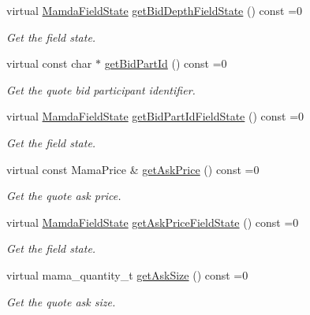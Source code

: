 \begin{CompactItemize}
virtual \hyperlink{namespaceWombat_93aac974f2ab713554fd12a1fa3b7d2a}{Mamda\-Field\-State} \hyperlink{classWombat_1_1MamdaQuotePossiblyDuplicate_4b1d107fcfe64b924befd77fe85bd953}{get\-Bid\-Depth\-Field\-State} () const =0
\begin{CompactList}\small\item\em Get the field state. \item\end{CompactList}\item 
virtual const char $\ast$ \hyperlink{classWombat_1_1MamdaQuotePossiblyDuplicate_fed97084e8d88c1c9aefb5dfb85d8105}{get\-Bid\-Part\-Id} () const =0
\begin{CompactList}\small\item\em Get the quote bid participant identifier. \item\end{CompactList}\item 
virtual \hyperlink{namespaceWombat_93aac974f2ab713554fd12a1fa3b7d2a}{Mamda\-Field\-State} \hyperlink{classWombat_1_1MamdaQuotePossiblyDuplicate_9b3ff8e4320ac2cf412599420c5e3b81}{get\-Bid\-Part\-Id\-Field\-State} () const =0
\begin{CompactList}\small\item\em Get the field state. \item\end{CompactList}\item 
virtual const Mama\-Price \& \hyperlink{classWombat_1_1MamdaQuotePossiblyDuplicate_5b73feb8586edb3073cdd904665c510a}{get\-Ask\-Price} () const =0
\begin{CompactList}\small\item\em Get the quote ask price. \item\end{CompactList}\item 
virtual \hyperlink{namespaceWombat_93aac974f2ab713554fd12a1fa3b7d2a}{Mamda\-Field\-State} \hyperlink{classWombat_1_1MamdaQuotePossiblyDuplicate_40e92e9acd45a2939ade49dd79a011e4}{get\-Ask\-Price\-Field\-State} () const =0
\begin{CompactList}\small\item\em Get the field state. \item\end{CompactList}\item 
virtual mama\_\-quantity\_\-t \hyperlink{classWombat_1_1MamdaQuotePossiblyDuplicate_a0e6687f8fc0a54991355e06ddd964e9}{get\-Ask\-Size} () const =0
\begin{CompactList}\small\item\em Get the quote ask size. \item\end{CompactList}\item 

\end{CompactItemize}
